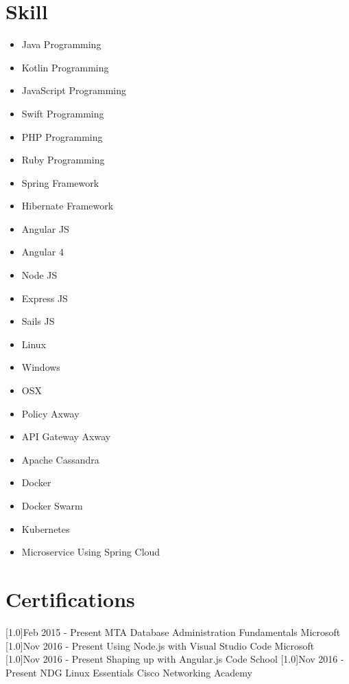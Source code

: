 \documentclass[english]{cv-style}
\begin{document}
\section{Skill}
\vspace{-0.3cm}
\begin{itemize}
\item Java Programming
\item Kotlin Programming
\item JavaScript Programming
\item Swift Programming
\item PHP Programming
\item Ruby Programming
\item Spring Framework
\item Hibernate Framework
\item Angular JS
\item Angular 4
\item Node JS
\item Express JS
\item Sails JS
\item Linux
\item Windows
\item OSX
\item Policy Axway
\item API Gateway Axway
\item Apache Cassandra
\item Docker
\item Docker Swarm
\item Kubernetes
\item Microservice Using Spring Cloud
\end{itemize}
\section{Certifications}
\vspace{-0.3cm}
\begin{entrylist}
\entry
{\scalebox{.8}[1.0]{Feb 2015 - Present}}
{MTA Database Administration Fundamentals}
{Microsoft}
{}
\entry
{\scalebox{.8}[1.0]{Nov 2016 - Present}}
{Using Node.js with Visual Studio Code}
{Microsoft}
{}
\entry
{\scalebox{.8}[1.0]{Nov 2016 - Present}}
{Shaping up with Angular.js}
{Code School}
{}
\entry
{\scalebox{.8}[1.0]{Nov 2016 - Present}}
{NDG Linux Essentials}
{Cisco Networking Academy}
{}
\end{entrylist}
\end{document}
